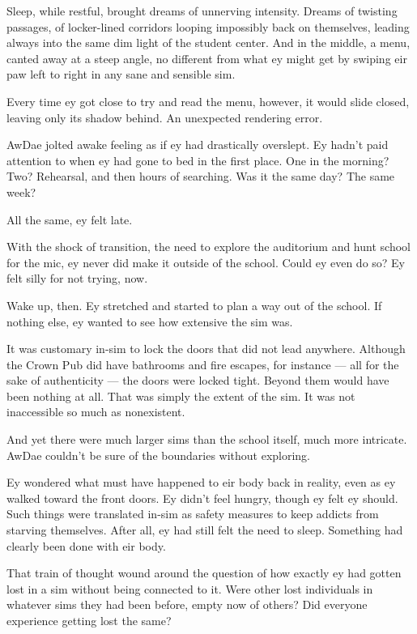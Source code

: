 Sleep, while restful, brought dreams of unnerving intensity. Dreams of twisting passages, of locker-lined corridors looping impossibly back on themselves, leading always into the same dim light of the student center. And in the middle, a menu, canted away at a steep angle, no different from what ey might get by swiping eir paw left to right in any sane and sensible sim.

Every time ey got close to try and read the menu, however, it would slide closed, leaving only its shadow behind. An unexpected rendering error.

AwDae jolted awake feeling as if ey had drastically overslept. Ey hadn't paid attention to when ey had gone to bed in the first place. One in the morning? Two? Rehearsal, and then hours of searching. Was it the same day? The same week?

All the same, ey felt late.

With the shock of transition, the need to explore the auditorium and hunt school for the mic, ey never did make it outside of the school. Could ey even do so? Ey felt silly for not trying, now.

Wake up, then. Ey stretched and started to plan a way out of the school. If nothing else, ey wanted to see how extensive the sim was.

It was customary in-sim to lock the doors that did not lead anywhere. Although the Crown Pub did have bathrooms and fire escapes, for instance — all for the sake of authenticity — the doors were locked tight. Beyond them would have been nothing at all. That was simply the extent of the sim. It was not inaccessible so much as nonexistent.

And yet there were much larger sims than the school itself, much more intricate. AwDae couldn't be sure of the boundaries without exploring.

Ey wondered what must have happened to eir body back in reality, even as ey walked toward the front doors. Ey didn't feel hungry, though ey felt ey should. Such things were translated in-sim as safety measures to keep addicts from starving themselves. After all, ey had still felt the need to sleep. Something had clearly been done with eir body.

That train of thought wound around the question of how exactly ey had gotten lost in a sim without being connected to it. Were other lost individuals in whatever sims they had been before, empty now of others? Did everyone experience getting lost the same?

